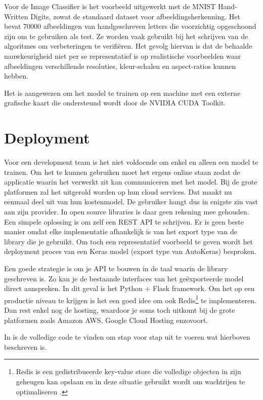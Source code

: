 Voor de Image Classifier is het voorbeeld uitgewerkt met de MNIST Hand-Written Digits, zowat de standaard dataset voor afbeeldingsherkenning. Het bevat 70000 afbeeldingen van handgeschreven letters die voorzichtig opgeschoond zijn om te gebruiken als test. Ze worden vaak gebruikt bij het schrijven van de algoritmes om verbeteringen te verifiëren. Het gevolg hiervan is dat de behaalde nauwkeurigheid niet per se representatief is op realistische voorbeelden waar afbeeldingen verschillende resoluties, kleur-schalen en aspect-ratios kunnen hebben.

Het is aangewezen om het model te trainen op een machine met een externe grafische kaart die ondersteund wordt door de NVIDIA CUDA Toolkit.

\section{Deployment}
\label{sec:deployment}

Voor een development team is het niet voldoende om enkel en alleen een model te trainen. Om het te kunnen gebruiken moet het ergens online staan zodat de applicatie waarin het verwerkt zit kan communiceren met het model. Bij de grote platformen zal het uitgerold worden op hun cloud services. Dat maakt nu eenmaal deel uit van hun kostenmodel. De gebruiker hangt dus in enigste zin vast aan zijn provider. 
In open source libraries is daar geen rekening mee gehouden. Een simpele oplossing is om zelf een REST API te schrijven. Er is geen beste manier omdat elke implementatie afhankelijk is van het export type van de library die je gebruikt. Om toch een representatief voorbeeld te geven wordt het deployment proces van een Keras model (export type van AutoKeras) besproken. 

Een goede strategie is om je API te bouwen in de taal waarin de library geschreven is. Zo kan je de bestaande interfaces van het geëxporteerde model direct aanspreken. In dit geval is het Python + Flask framework. Om het op een productie niveau te krijgen is het een goed idee om ook Redis\footnote{Redis is een gedistribueerde key-value store die volledige objecten in zijn geheugen kan opslaan en in deze situatie gebruikt wordt om wachtrijen te optimaliseren \autocite{Adrian2018}.} te implementeren. Dan rest enkel nog de hosting, waardoor je soms toch uitkomt bij de grote platformen zoals Amazon AWS, Google Cloud Hosting enzovoort.

In \textcite{Adrian2018} is de volledige code te vinden om stap voor stap uit te voeren wat hierboven beschreven is.
